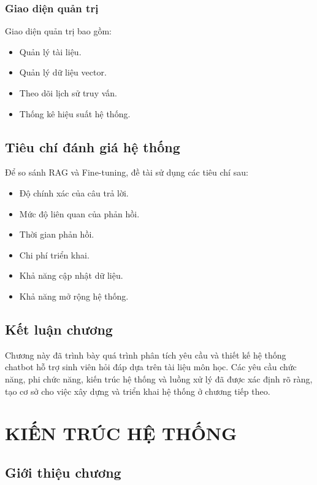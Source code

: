 \documentclass[12pt,a4paper]{report}
\begin{document}
	\subsection{Giao diện quản trị}
	
	Giao diện quản trị bao gồm:
	
	\begin{itemize}
		\item Quản lý tài liệu.
		\item Quản lý dữ liệu vector.
		\item Theo dõi lịch sử truy vấn.
		\item Thống kê hiệu suất hệ thống.
	\end{itemize}
	
	\section{Tiêu chí đánh giá hệ thống}
	
	Để so sánh RAG và Fine-tuning, đề tài sử dụng các tiêu chí sau:
	
	\begin{itemize}
		\item Độ chính xác của câu trả lời.
		\item Mức độ liên quan của phản hồi.
		\item Thời gian phản hồi.
		\item Chi phí triển khai.
		\item Khả năng cập nhật dữ liệu.
		\item Khả năng mở rộng hệ thống.
	\end{itemize}
	
	\section{Kết luận chương}
	
	Chương này đã trình bày quá trình phân tích yêu cầu và thiết kế hệ thống chatbot hỗ trợ sinh viên hỏi đáp dựa trên tài liệu môn học. Các yêu cầu chức năng, phi chức năng, kiến trúc hệ thống và luồng xử lý đã được xác định rõ ràng, tạo cơ sở cho việc xây dựng và triển khai hệ thống ở chương tiếp theo.
	
	\chapter{KIẾN TRÚC HỆ THỐNG}
	
	\section{Giới thiệu chương}
	
\end{document}
